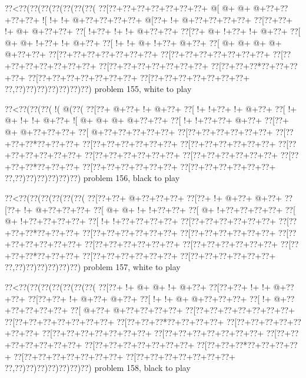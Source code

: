 \vbox{\vbox{\goo
\0??<\0??(\0??(\0??(\0??(\0??(\0??(\0??(
\0??[\0??+\0??+\0??+\0??+\0??+\0??+\0??+
\- @[\- @+\- @+\- @+\0??+\0??+\0??+\0??+
\- ![\- !+\- !+\- @+\0??+\0??+\0??+\0??+
\- @[\0??+\- !+\- @+\0??+\0??+\0??+\0??+
\0??[\0??+\0??+\- !+\- @+\- @+\0??+\0??+
\0??[\- !+\0??+\- !+\- !+\- @+\0??+\0??+
\0??[\0??+\- @+\- !+\0??+\- !+\- @+\0??+
\0??[\- @+\- @+\- !+\0??+\- !+\- @+\0??+
\0??[\- !+\- !+\- @+\- !+\0??+\- @+\0??+
\0??[\- @+\- @+\- @+\- @+\- @+\0??+\0??+
\0??[\0??+\0??+\0??+\0??+\0??+\0??+\0??+
\0??[\0??+\0??+\0??+\0??+\0??+\0??+\0??+
\0??[\0??+\0??+\0??+\0??+\0??+\0??+\0??+
\0??[\0??+\0??+\0??+\0??+\0??+\0??+\0??+
\0??[\0??+\0??+\0??*\0??+\0??+\0??+\0??+
\0??[\0??+\0??+\0??+\0??+\0??+\0??+\0??+
\0??[\0??+\0??+\0??+\0??+\0??+\0??+\0??+
\0??,\0??)\0??)\0??)\0??)\0??)\0??)\0??)
}
\hfil problem 155, white to play\hfil\break
}

\vbox{\vbox{\goo
\0??<\0??(\0??(\0??(\- !(\- @(\0??(
\0??[\0??+\- @+\0??+\- !+\- @+\0??+
\0??[\- !+\- !+\0??+\- !+\- @+\0??+
\0??[\- !+\- @+\- !+\- !+\- @+\0??+
\- ![\- @+\- @+\- @+\- @+\0??+\0??+
\0??[\- !+\- !+\0??+\0??+\- @+\0??+
\0??[\0??+\- @+\- @+\0??+\0??+\0??+
\0??[\- @+\0??+\0??+\0??+\0??+\0??+
\0??[\0??+\0??+\0??+\0??+\0??+\0??+
\0??[\0??+\0??+\0??*\0??+\0??+\0??+
\0??[\0??+\0??+\0??+\0??+\0??+\0??+
\0??[\0??+\0??+\0??+\0??+\0??+\0??+
\0??[\0??+\0??+\0??+\0??+\0??+\0??+
\0??[\0??+\0??+\0??+\0??+\0??+\0??+
\0??[\0??+\0??+\0??+\0??+\0??+\0??+
\0??[\0??+\0??+\0??*\0??+\0??+\0??+
\0??[\0??+\0??+\0??+\0??+\0??+\0??+
\0??[\0??+\0??+\0??+\0??+\0??+\0??+
\0??,\0??)\0??)\0??)\0??)\0??)\0??)
}
\hfil problem 156, black to play\hfil\break
}

\vbox{\vbox{\goo
\0??<\0??(\0??(\0??(\0??(\0??(\0??(
\0??[\0??+\0??+\- @+\0??+\0??+\0??+
\0??[\0??+\- !+\- @+\0??+\- @+\0??+
\0??[\0??+\- !+\- @+\0??+\0??+\0??+
\0??[\- @+\- @+\- !+\- !+\0??+\0??+
\0??[\- @+\- !+\0??+\0??+\0??+\0??+
\0??[\- @+\- !+\0??+\0??+\0??+\0??+
\0??[\- !+\- !+\0??+\0??+\0??+\0??+
\0??[\0??+\0??+\0??+\0??+\0??+\0??+
\0??[\0??+\0??+\0??*\0??+\0??+\0??+
\0??[\0??+\0??+\0??+\0??+\0??+\0??+
\0??[\0??+\0??+\0??+\0??+\0??+\0??+
\0??[\0??+\0??+\0??+\0??+\0??+\0??+
\0??[\0??+\0??+\0??+\0??+\0??+\0??+
\0??[\0??+\0??+\0??+\0??+\0??+\0??+
\0??[\0??+\0??+\0??*\0??+\0??+\0??+
\0??[\0??+\0??+\0??+\0??+\0??+\0??+
\0??[\0??+\0??+\0??+\0??+\0??+\0??+
\0??,\0??)\0??)\0??)\0??)\0??)\0??)
}
\hfil problem 157, white to play\hfil\break
}

\vbox{\vbox{\goo
\0??<\0??(\0??(\0??(\0??(\0??(\0??(\0??(
\0??[\0??+\- !+\- @+\- @+\- !+\- @+\0??+
\0??[\0??+\0??+\- !+\- !+\- @+\0??+\0??+
\0??[\0??+\0??+\- !+\- @+\0??+\- @+\0??+
\0??[\- !+\- !+\- @+\- @+\0??+\0??+\0??+
\0??[\- !+\- @+\0??+\0??+\0??+\0??+\0??+
\0??[\- @+\0??+\- @+\0??+\0??+\0??+\0??+
\0??[\0??+\0??+\0??+\0??+\0??+\0??+\0??+
\0??[\0??+\0??+\0??+\0??+\0??+\0??+\0??+
\0??[\0??+\0??+\0??*\0??+\0??+\0??+\0??+
\0??[\0??+\0??+\0??+\0??+\0??+\0??+\0??+
\0??[\0??+\0??+\0??+\0??+\0??+\0??+\0??+
\0??[\0??+\0??+\0??+\0??+\0??+\0??+\0??+
\0??[\0??+\0??+\0??+\0??+\0??+\0??+\0??+
\0??[\0??+\0??+\0??+\0??+\0??+\0??+\0??+
\0??[\0??+\0??+\0??*\0??+\0??+\0??+\0??+
\0??[\0??+\0??+\0??+\0??+\0??+\0??+\0??+
\0??[\0??+\0??+\0??+\0??+\0??+\0??+\0??+
\0??,\0??)\0??)\0??)\0??)\0??)\0??)\0??)
}
\hfil problem 158, black to play\hfil\break
}

